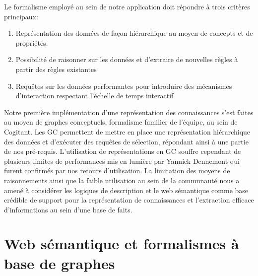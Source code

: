 Le formalisme employé au sein de notre application doit répondre à trois critères principaux:

\begin{enumerate}
  \item Représentation des données de façon hiérarchique au moyen de concepts et de propriétés.
  \item Possibilité de raisonner sur les données et d'extraire de nouvelles règles à partir des règles existantes
  \item Requêtes sur les données performantes pour introduire des mécanismes d'interaction respectant l'échelle de temps interactif
\end{enumerate}

Notre première implémentation d'une représentation des connaissances s'est faites au moyen de graphes conceptuels, formalisme familier de l'équipe, au sein de Cogitant. Les GC permettent de mettre en place une représentation hiérarchique des données et d’exécuter des requêtes de sélection, répondant ainsi à une partie de nos pré-requis. L'utilisation de représentations en GC souffre cependant de plusieurs limites de performances mis en lumière par Yannick Dennemont \cite{dennemont2013assistance} qui furent confirmés par nos retours d'utilisation.
La limitation des moyens de raisonnements ainsi que la faible utilisation au sein de la communauté nous a amené à considérer les logiques de description et le web sémantique comme base crédible de support pour la représentation de connaissances et l'extraction efficace d'informations au sein d'une base de faits. 

\section{Web sémantique et formalismes à base de graphes}


